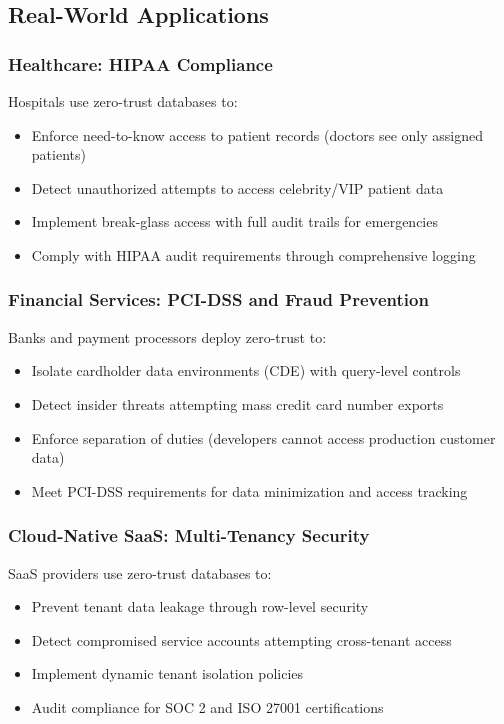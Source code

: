 \subsection{Real-World Applications}

\subsubsection{Healthcare: HIPAA Compliance}

Hospitals use zero-trust databases to:
\begin{itemize}
    \item Enforce need-to-know access to patient records (doctors see only assigned patients)
    \item Detect unauthorized attempts to access celebrity/VIP patient data
    \item Implement break-glass access with full audit trails for emergencies
    \item Comply with HIPAA audit requirements through comprehensive logging
\end{itemize}

\subsubsection{Financial Services: PCI-DSS and Fraud Prevention}

Banks and payment processors deploy zero-trust to:
\begin{itemize}
    \item Isolate cardholder data environments (CDE) with query-level controls
    \item Detect insider threats attempting mass credit card number exports
    \item Enforce separation of duties (developers cannot access production customer data)
    \item Meet PCI-DSS requirements for data minimization and access tracking
\end{itemize}

\subsubsection{Cloud-Native SaaS: Multi-Tenancy Security}

SaaS providers use zero-trust databases to:
\begin{itemize}
    \item Prevent tenant data leakage through row-level security
    \item Detect compromised service accounts attempting cross-tenant access
    \item Implement dynamic tenant isolation policies
    \item Audit compliance for SOC 2 and ISO 27001 certifications
\end{itemize}

